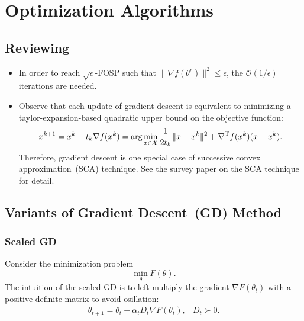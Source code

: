 \chapter{Optimization Algorithms}

\section{Reviewing}
\begin{itemize}
\item
In order to reach $\sqrt{\epsilon}$-FOSP such that $\|\nabla f(\theta^r)\|^2\le\epsilon$, 
the $\mathcal{O}(1/\epsilon)$ iterations are needed.
\item
Observe that each update of gradient descent is equivalent to minimizing a taylor-expansion-based quadratic upper bound on the objective function:
\[
x^{k+1}=x^k-t_k\nabla f(x^k)=\arg\min_{x\in\mathcal{X}}\frac{1}{2t_k}\|x-x^k\|^2+\nabla^{\mathrm T} f(x^k)(x-x^k).
\]
Therefore, gradient descent is one special case of successive convex approximation~(SCA) technique.
See the survey paper \citep{Razaviyayn2014SuccessiveCA} on the SCA technique for detail.
\end{itemize}


\section{Variants of Gradient Descent~(GD) Method}
\subsection{Scaled GD}
Consider the minimization problem
\[
\min_{\theta}F(\theta).
\]
The intuition of the scaled GD is to left-multiply the gradient $\nabla F(\theta_t)$ with a positive definite matrix to avoid osillation:
\[
\begin{array}{ll}
\theta_{t+1} = \theta_t - \alpha_tD_t\nabla F(\theta_t),
&
D_t\succ0.
\end{array}
\]

